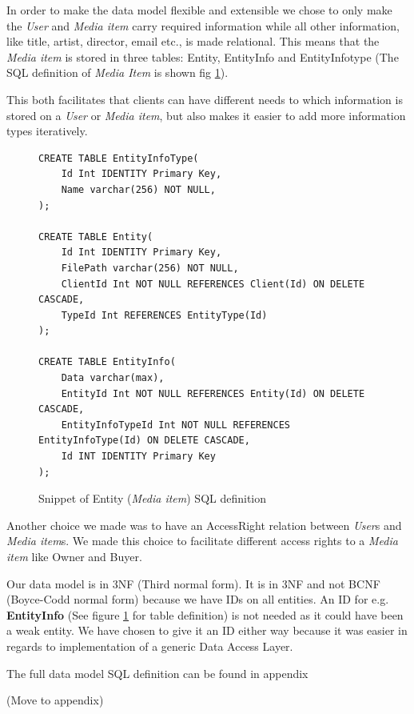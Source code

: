 \documentclass[../report.tex]{subfiles}
\begin{document}
In order to make the data model flexible and extensible we chose to only make the \textit{User} and \textit{Media item} carry required information while all other information, like title, artist, director, email etc., is made relational. This means that the \textit{Media item} is stored in three tables: Entity, EntityInfo and EntityInfotype (The SQL definition of \textit{Media Item} is shown fig \ref{datamodel}).

This both facilitates that clients can have different needs to which information is stored on a \textit{User} or \textit{Media item}, but also makes it easier to add more information types iteratively.\\

\begin{figure}[H]
\begin{lstlisting}
CREATE TABLE EntityInfoType(
	Id Int IDENTITY Primary Key,
	Name varchar(256) NOT NULL,
);

CREATE TABLE Entity(
	Id Int IDENTITY Primary Key,
	FilePath varchar(256) NOT NULL,
	ClientId Int NOT NULL REFERENCES Client(Id) ON DELETE CASCADE,
	TypeId Int REFERENCES EntityType(Id)
);

CREATE TABLE EntityInfo(
	Data varchar(max),
	EntityId Int NOT NULL REFERENCES Entity(Id) ON DELETE CASCADE,
	EntityInfoTypeId Int NOT NULL REFERENCES EntityInfoType(Id) ON DELETE CASCADE,
	Id INT IDENTITY Primary Key
);
\end{lstlisting}
\caption{Snippet of Entity (\textit{Media item}) SQL definition}
\label{datamodel}
\end{figure}

Another choice we made was to have an AccessRight relation between \textit{User}s and \textit{Media item}s. We made this choice to facilitate different access rights to a \textit{Media item} like Owner and Buyer.

Our data model is in 3NF (Third normal form). It is in 3NF and not BCNF (Boyce-Codd normal form) because we have IDs on all entities. An ID for e.g. \textbf{EntityInfo} (See figure \ref{datamodel} for table definition) is not needed as it could have been a weak entity. We have chosen to give it an ID either way because it was easier in regards to implementation of a generic Data Access Layer.

The full data model SQL definition can be found in appendix

(Move to appendix)
\end{document}
